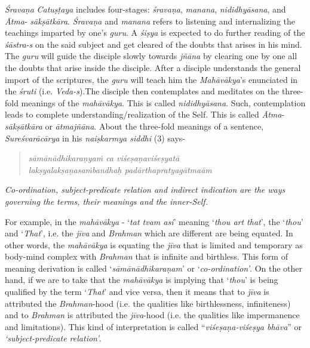 \emph{Śravaṇa} \emph{Catuṣṭaya} includes four-stages: \emph{śravaṇa}, \emph{manana}, \emph{nididhyāsana}, and \emph{Ātma}- \emph{sākṣātkāra}. \emph{Śravaṇa} and \emph{manana} refers to listening and internalizing the teachings imparted by one's \emph{guru}. A \emph{śiṣya} is expected to do further reading of the \emph{śāstra-s} on the said subject and get cleared of the doubts that arises in his mind. The \emph{guru} will guide the disciple slowly towards \emph{jñāna} by clearing one by one all the doubts that arise inside the disciple. After a disciple understands the general import of the scriptures, the \emph{guru} will teach him the \emph{Mahāvākya}'s enunciated in the \emph{śruti} (i.e. \emph{Veda-s}).The disciple then contemplates and meditates on the three-fold meanings of the \emph{mahāvākya}. This is called \emph{nididhyāsana}. Such, contemplation leads to complete understanding/realization of the Self. This is called \emph{Ātma}-\emph{sākṣātkāra} or \emph{ātmajñāna}. About the three-fold meanings of a sentence, \emph{Sureśvarācārya} in his \emph{naiṣkarmya siddhi} (3) says-

\begin{verse}
\emph{sāmānādhikaraṇyaṁ ca viśeṣaṇaviśeṣyatā }\\
\emph{lakṣyalakṣaṇasaṁbandhaḥ padārthapratyagātmaām }
\end{verse}

\emph{Co-ordination, subject-predicate relation and indirect indication are the ways governing the terms, their meanings and the inner-Self.}

For example, in the \emph{mahāvākya} - `\emph{tat tvam asi}' meaning `\emph{thou art that}', the `\emph{thou}' and `\emph{That}', i.e. the \emph{jīva} and \emph{Brahman} which are different are being equated. In other words, the \emph{mahāvākya} is equating the \emph{jīva} that is limited and temporary as body-mind complex with \emph{Brahman} that is infinite and birthless. This form of meaning derivation is called `\emph{sāmānādhikaraṇam}' or `\emph{co-ordination'}. On the other hand, if we are to take that the \emph{mahāvākya} is implying that `\emph{thou}' is being qualified by the term `\emph{That}' and vice versa, then it means that to \emph{jīva} is attributed the \emph{Brahman}-hood (i.e. the qualities like birthlessness, infiniteness) and to \emph{Brahman} is attributed the \emph{jīva}-hood (i.e. the qualities like impermanence and limitations). This kind of interpretation is called ``\emph{viśeṣaṇa-viśeṣya bhāva}'' or \emph{`subject-predicate relation'}.

